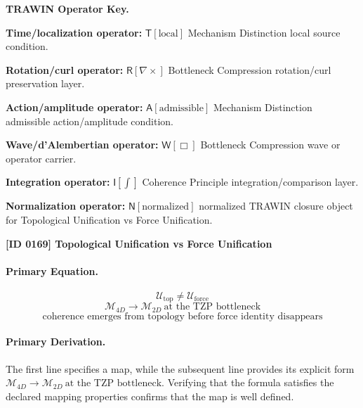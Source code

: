 \par\vspace{0.45\baselineskip}
\noindent\begin{minipage}[t]{\linewidth}
\begingroup
\small
\raggedright
\textbf{TRAWIN Operator Key.}\par
\noindent\textbf{Time/localization operator:} $\mathsf{T}\!\left[\mathrm{local}\right]$ Mechanism Distinction local source condition.\par
\noindent\textbf{Rotation/curl operator:} $\mathsf{R}\!\left[\nabla\times\right]$ Bottleneck Compression rotation/curl preservation layer.\par
\noindent\textbf{Action/amplitude operator:} $\mathsf{A}\!\left[\mathrm{admissible}\right]$ Mechanism Distinction admissible action/amplitude condition.\par
\noindent\textbf{Wave/d'Alembertian operator:} $\mathsf{W}\!\left[\Box\right]$ Bottleneck Compression wave or operator carrier.\par
\noindent\textbf{Integration operator:} $\mathsf{I}\!\left[\int\right]$ Coherence Principle integration/comparison layer.\par
\noindent\textbf{Normalization operator:} $\mathsf{N}\!\left[\mathrm{normalized}\right]$ normalized TRAWIN closure object for Topological Unification vs Force Unification.\par
\endgroup
\end{minipage}

\clearpage
\noindent\textbf{[ID 0169] Topological Unification vs Force Unification}\par
\vspace{0.35em}
\paragraph{Primary Equation.}
\[
\mathcal{U}_{\mathrm{top}}\neq \mathcal{U}_{\mathrm{force}}
\]
\[
\mathcal{M}_{4D}\longrightarrow \mathcal{M}_{2D}\ \text{at the TZP bottleneck}
\]
\[
\text{coherence emerges from topology before force identity disappears}
\]

\paragraph{Primary Derivation.}
The first line specifies a map, while the subsequent line provides its explicit form \( \mathcal{M}_{4D}\longrightarrow \mathcal{M}_{2D}\ \text{at the TZP bottleneck} \). Verifying that the formula satisfies the declared mapping properties confirms that the map is well defined.
